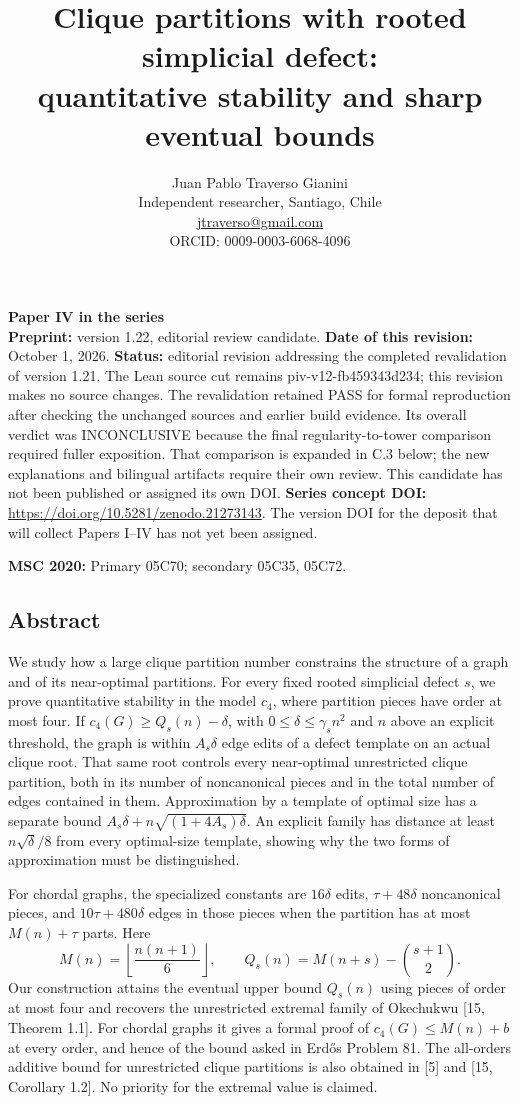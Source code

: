 \documentclass[english,11pt,a4paper]{article}
\title{Clique partitions with rooted simplicial defect:\\quantitative stability and sharp eventual bounds}
\author{Juan Pablo Traverso Gianini\\
\small Independent researcher, Santiago, Chile\\
\small \href{mailto:jtraverso@gmail.com}{jtraverso@gmail.com}\\
\small ORCID: 0009-0003-6068-4096}
\date{}
\begin{document}
\raggedbottom
\maketitle
\textbf{Paper IV in the series}\\
\textbf{Preprint:} version 1.22, editorial review candidate. \textbf{Date of this revision:} October 1, 2026. \textbf{Status:} editorial revision addressing the completed revalidation of version 1.21. The Lean source cut remains {\ttfamily\small piv-\discretionary{\hbox{\ensuremath{\hookrightarrow}}}{}{}v12-\discretionary{\hbox{\ensuremath{\hookrightarrow}}}{}{}fb459343d234}; this revision makes no source changes. The revalidation retained PASS for formal reproduction after checking the unchanged sources and earlier build evidence. Its overall verdict was INCONCLUSIVE because the final regularity-to-tower comparison required fuller exposition. That comparison is expanded in C.3 below; the new explanations and bilingual artifacts require their own review. This candidate has not been published or assigned its own DOI. \textbf{Series concept DOI:} \url{https://doi.org/10.5281/zenodo.21273143}. The version DOI for the deposit that will collect Papers I--IV has not yet been assigned.

\textbf{MSC 2020:} Primary 05C70; secondary 05C35, 05C72.

\subsection{Abstract}\label{abstract}

We study how a large clique partition number constrains the structure of a graph and of its near-optimal partitions. For every fixed rooted simplicial defect \(s\), we prove quantitative stability in the model \(c_4\), where partition pieces have order at most four. If \(c_4(G)\ge Q_s(n)-\delta\), with \(0\le\delta\le\gamma_s n^2\) and \(n\) above an explicit threshold, the graph is within \(A_s\delta\) edge edits of a defect template on an actual clique root. That same root controls every near-optimal unrestricted clique partition, both in its number of noncanonical pieces and in the total number of edges contained in them. Approximation by a template of optimal size has a separate bound \(A_s\delta+n\sqrt{(1+4A_s)\delta}\). An explicit family has distance at least \(n\sqrt{\delta}/8\) from every optimal-size template, showing why the two forms of approximation must be distinguished.

For chordal graphs, the specialized constants are \(16\delta\) edits, \(\tau+48\delta\) noncanonical pieces, and \(10\tau+480\delta\) edges in those pieces when the partition has at most \(M(n)+\tau\) parts. Here \[
M(n)=\left\lfloor\frac{n(n+1)}6\right\rfloor,\qquad
Q_s(n)=M(n+s)-\binom{s+1}{2}.
\] Our construction attains the eventual upper bound \(Q_s(n)\) using pieces of order at most four and recovers the unrestricted extremal family of Okechukwu {[}15, Theorem 1.1{]}. For chordal graphs it gives a formal proof of \(c_4(G)\le M(n)+b\) at every order, and hence of the bound asked in Erdős Problem 81. The all-orders additive bound for unrestricted clique partitions is also obtained in {[}5{]} and {[}15, Corollary 1.2{]}. No priority for the extremal value is claimed.
\end{document}
